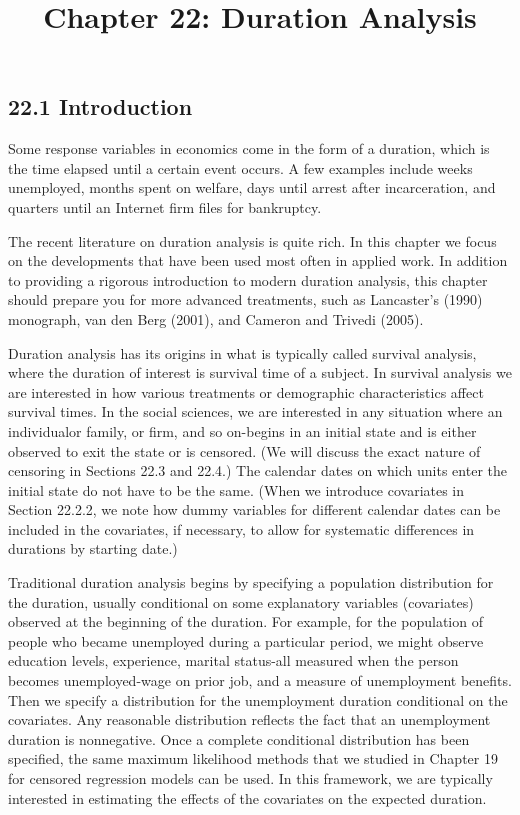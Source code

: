 \documentclass[10pt]{article}
\title{Chapter 22: Duration Analysis}
\author{}
\date{}
\begin{document}
\maketitle

\subsection*{22.1 Introduction}
Some response variables in economics come in the form of a duration, which is the time elapsed until a certain event occurs. A few examples include weeks unemployed, months spent on welfare, days until arrest after incarceration, and quarters until an Internet firm files for bankruptcy.

The recent literature on duration analysis is quite rich. In this chapter we focus on the developments that have been used most often in applied work. In addition to providing a rigorous introduction to modern duration analysis, this chapter should prepare you for more advanced treatments, such as Lancaster's (1990) monograph, van den Berg (2001), and Cameron and Trivedi (2005).

Duration analysis has its origins in what is typically called survival analysis, where the duration of interest is survival time of a subject. In survival analysis we are interested in how various treatments or demographic characteristics affect survival times. In the social sciences, we are interested in any situation where an individualor family, or firm, and so on-begins in an initial state and is either observed to exit the state or is censored. (We will discuss the exact nature of censoring in Sections 22.3 and 22.4.) The calendar dates on which units enter the initial state do not have to be the same. (When we introduce covariates in Section 22.2.2, we note how dummy variables for different calendar dates can be included in the covariates, if necessary, to allow for systematic differences in durations by starting date.)

Traditional duration analysis begins by specifying a population distribution for the duration, usually conditional on some explanatory variables (covariates) observed at the beginning of the duration. For example, for the population of people who became unemployed during a particular period, we might observe education levels, experience, marital status-all measured when the person becomes unemployed-wage on prior job, and a measure of unemployment benefits. Then we specify a distribution for the unemployment duration conditional on the covariates. Any reasonable distribution reflects the fact that an unemployment duration is nonnegative. Once a complete conditional distribution has been specified, the same maximum likelihood methods that we studied in Chapter 19 for censored regression models can be used. In this framework, we are typically interested in estimating the effects of the covariates on the expected duration.
\end{document}
